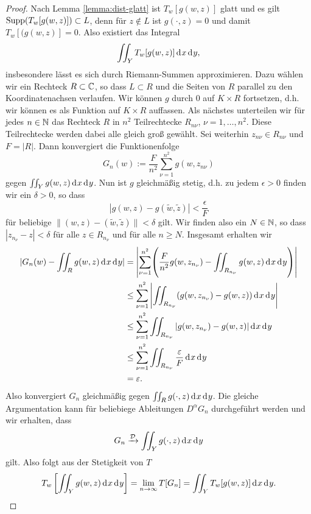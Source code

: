 \begin{proof}
  Nach Lemma \ref{lemma:dist-glatt} ist $T_w[g(w,z)]$ glatt und es
  gilt $\operatorname{Supp}(T_w[g(w,z)]) \subset L$, denn für $z \notin L$ ist
  $g(\cdot, z) = 0$ und damit $T_w[(g(w,z)] = 0$. 
  Also existiert das Integral
  \[
  \iint_Y T_w[g(w,z)] \d[x]\d[y],
  \]
  insbesondere lässt es sich durch Riemann-Summen approximieren. 
  Dazu wählen wir ein Rechteck $R \subset \mathbb{C}$, so dass $L \subset R$
  und die Seiten von $R$ parallel zu den Koordinatenachsen
  verlaufen. 
  Wir können $g$ durch 0 auf $K \times R$ fortsetzen, d.h. wir können
  es als Funktion auf $K \times R$ auffassen. 
  Als nächstes unterteilen wir für jedes $n \in \mathbb{N}$ das Rechteck $R$ in $n^2$
  Teilrechtecke $R_{n\nu}$, $\nu = 1, \dots, n^2$. Diese Teilrechtecke
  werden dabei alle gleich groß gewählt. Sei weiterhin $z_{n\nu}
  \in R_{n \nu}$ und $F = |R|$. 
  Dann konvergiert die Funktionenfolge
  \[
  G_n(w) := \frac{F}{n^2} \sum_{\nu=1}^{n^2} g(w, z_{n\nu})
  \]
  gegen $\iint_Y g(w,z) \d[x]\d[y]$. Nun ist $g$ gleichmäßig stetig,
  d.h. zu jedem $\epsilon > 0$ finden wir ein $\delta >0$, so dass
  \[
  | g(w,z) - g(\tilde w, \tilde z) | < \frac{\epsilon}{F}
  \]
  für beliebige $\| (w,z) - (\tilde w, \tilde z) \| < \delta$ gilt. Wir
  finden also ein $N \in \mathbb{N}$, so dass $|z_{n_\nu} - z| < \delta$ für
  alle $z \in R_{n_\nu}$ und für alle $n \geq N$. Insgesamt erhalten
  wir
  \begin{align*}
    |G_n(w) - \iint_R g(w,z) \d[x]\d[y]| & = \left | \sum_{\nu = 1}^{n^2}
    \middle ( \frac{F}{n^2} g(w, z_{n_\nu}) - \iint_{R_{n_\nu}} g(w,z)
      \d[x]\d[y] \middle ) \right | \\
    & \leq \sum_{\nu=1}^{n^2} \left | \iint_{R_{n_\nu}}
      (g(w,z_{n_\nu}) - g(w,z)) \d[x]\d[y] \right | \\
    & \leq \sum_{\nu=1}^{n^2} \iint_{R_{n_\nu}} |g(w, z_{n_\nu}) -
    g(w,z)| \d[x]\d[y] \\
    & \leq \sum_{\nu=1}^{n^2} \iint_{R_{n_\nu}} \frac{\epsilon}{F}
    \d[x] \d[y] \\
    & = \epsilon.
  \end{align*}
  Also konvergiert $G_n$ gleichmäßig gegen $\iint_R g(\cdot, z)
  \d[x]\d[y]$. Die gleiche Argumentation \break kann für beliebiege
  Ableitungen $D^\alpha G_n$ durchgeführt werden und wir erhalten,
  dass
  \[
  G_n \xrightarrow{\dist} \iint_Y g(\cdot, z) \d[x]\d[y]
  \]
  gilt. Also folgt aus der Stetigkeit von $T$
  \[
  T_w \left [ \iint_Y g(w, z) \d[x]\d[y] \right ] = \lim_{n \ra
    \infty} T[G_n] = \iint_Y T_w[g(w,z)] \d[x]\d[y].
  \]
\end{proof}

